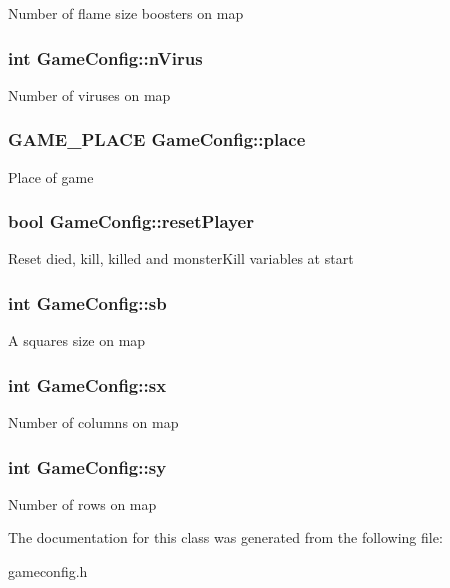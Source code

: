 Number of flame size boosters on map \hypertarget{class_game_config_aa497a44e022947c0a05d61f9ca6ea233}{
\subsubsection[{n\-Virus}]{\setlength{\rightskip}{0pt plus 5cm}int Game\-Config\-::n\-Virus}}\label{class_game_config_aa497a44e022947c0a05d61f9ca6ea233}
Number of viruses on map \hypertarget{class_game_config_a86bebdbe2a5f4493d0b792c09fe770c6}{
\subsubsection[{place}]{\setlength{\rightskip}{0pt plus 5cm}G\-A\-M\-E\-\_\-\-P\-L\-A\-C\-E Game\-Config\-::place}}\label{class_game_config_a86bebdbe2a5f4493d0b792c09fe770c6}
Place of game \hypertarget{class_game_config_a0d57ca4b0ff19ea78d3464164608d3dd}{
\subsubsection[{reset\-Player}]{\setlength{\rightskip}{0pt plus 5cm}bool Game\-Config\-::reset\-Player}}\label{class_game_config_a0d57ca4b0ff19ea78d3464164608d3dd}
Reset died, kill, killed and monster\-Kill variables at start \hypertarget{class_game_config_a948be02f34afe02e545363f1c676f988}{
\subsubsection[{sb}]{\setlength{\rightskip}{0pt plus 5cm}int Game\-Config\-::sb}}\label{class_game_config_a948be02f34afe02e545363f1c676f988}
A squares size on map \hypertarget{class_game_config_a2d0ce90177998c391616135c23940926}{
\subsubsection[{sx}]{\setlength{\rightskip}{0pt plus 5cm}int Game\-Config\-::sx}}\label{class_game_config_a2d0ce90177998c391616135c23940926}
Number of columns on map \hypertarget{class_game_config_a3e7e2289445c44a3f717b5d669567ec0}{
\subsubsection[{sy}]{\setlength{\rightskip}{0pt plus 5cm}int Game\-Config\-::sy}}\label{class_game_config_a3e7e2289445c44a3f717b5d669567ec0}
Number of rows on map 

The documentation for this class was generated from the following file\-:\begin{DoxyCompactItemize}
\item 
gameconfig.\-h\end{DoxyCompactItemize}
